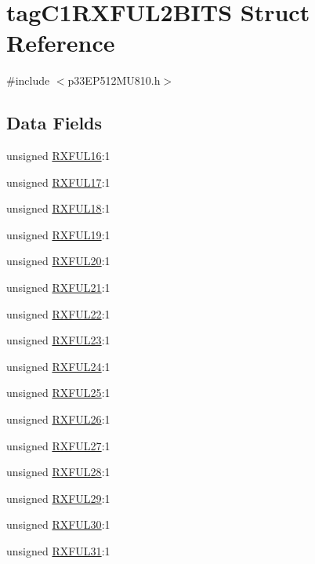 \hypertarget{structtag_c1_r_x_f_u_l2_b_i_t_s}{}\section{tag\+C1\+R\+X\+F\+U\+L2\+B\+I\+TS Struct Reference}
\label{structtag_c1_r_x_f_u_l2_b_i_t_s}


{\ttfamily \#include $<$p33\+E\+P512\+M\+U810.\+h$>$}

\subsection*{Data Fields}
\begin{DoxyCompactItemize}
\item 
unsigned \hyperlink{structtag_c1_r_x_f_u_l2_b_i_t_s_a3ecae8898ac754666575fc5a93ab707b}{R\+X\+F\+U\+L16}\+:1
\item 
unsigned \hyperlink{structtag_c1_r_x_f_u_l2_b_i_t_s_a2a9627fac97e7a2cdb3cd52bb5cef34e}{R\+X\+F\+U\+L17}\+:1
\item 
unsigned \hyperlink{structtag_c1_r_x_f_u_l2_b_i_t_s_a6166c7f59b583b995e7adda4f0d454d4}{R\+X\+F\+U\+L18}\+:1
\item 
unsigned \hyperlink{structtag_c1_r_x_f_u_l2_b_i_t_s_a666949bbfaa8bf13daf17c475136f46f}{R\+X\+F\+U\+L19}\+:1
\item 
unsigned \hyperlink{structtag_c1_r_x_f_u_l2_b_i_t_s_a08caaebeb7573468fe9875a35ade5fac}{R\+X\+F\+U\+L20}\+:1
\item 
unsigned \hyperlink{structtag_c1_r_x_f_u_l2_b_i_t_s_a9c146591190d82bdc90a886ceb32289c}{R\+X\+F\+U\+L21}\+:1
\item 
unsigned \hyperlink{structtag_c1_r_x_f_u_l2_b_i_t_s_ae149578f456f5b93a0d9edb684e5b17e}{R\+X\+F\+U\+L22}\+:1
\item 
unsigned \hyperlink{structtag_c1_r_x_f_u_l2_b_i_t_s_a807892ec44f2b14b21aeec63dbe6b837}{R\+X\+F\+U\+L23}\+:1
\item 
unsigned \hyperlink{structtag_c1_r_x_f_u_l2_b_i_t_s_af17969a1bda015e397611fc69f34770d}{R\+X\+F\+U\+L24}\+:1
\item 
unsigned \hyperlink{structtag_c1_r_x_f_u_l2_b_i_t_s_a9f960ac49536b958b6ba9b8e94ed11a2}{R\+X\+F\+U\+L25}\+:1
\item 
unsigned \hyperlink{structtag_c1_r_x_f_u_l2_b_i_t_s_aa637121874b4eacb95a971fcd6f4b614}{R\+X\+F\+U\+L26}\+:1
\item 
unsigned \hyperlink{structtag_c1_r_x_f_u_l2_b_i_t_s_ad3c599b3dab4b668d945102c3cd50af9}{R\+X\+F\+U\+L27}\+:1
\item 
unsigned \hyperlink{structtag_c1_r_x_f_u_l2_b_i_t_s_abfea9cdb7a2c96693d2baa84de1dc3c2}{R\+X\+F\+U\+L28}\+:1
\item 
unsigned \hyperlink{structtag_c1_r_x_f_u_l2_b_i_t_s_a3412164598cd07d1e5eea0e94c1ce90d}{R\+X\+F\+U\+L29}\+:1
\item 
unsigned \hyperlink{structtag_c1_r_x_f_u_l2_b_i_t_s_a200970d0da6966ba73951ae71b4fa9c5}{R\+X\+F\+U\+L30}\+:1
\item 
unsigned \hyperlink{structtag_c1_r_x_f_u_l2_b_i_t_s_a328036358bb63073c684195e6b9f65db}{R\+X\+F\+U\+L31}\+:1
\end{DoxyCompactItemize}



